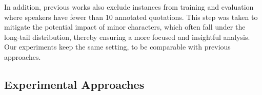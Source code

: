 \documentclass[letterpaper]{article} %
\begin{document}
In addition, previous works also exclude instances from training and evaluation where speakers have fewer than 10 annotated quotations. This step was taken to mitigate the potential impact of minor characters, which often fall under the long-tail distribution, thereby ensuring a more focused and insightful analysis. Our experiments keep the same setting, to be comparable with previous approaches.




\subsection{Experimental Approaches}
\label{ssec:cross-approach}

\end{document}
